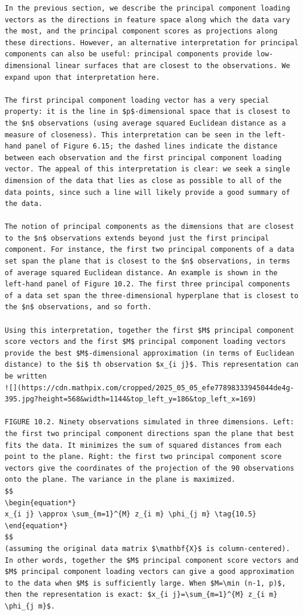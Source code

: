 \documentclass[10pt]{article}
\begin{document}
\begin{verbatim}
In the previous section, we describe the principal component loading vectors as the directions in feature space along which the data vary the most, and the principal component scores as projections along these directions. However, an alternative interpretation for principal components can also be useful: principal components provide low-dimensional linear surfaces that are closest to the observations. We expand upon that interpretation here.

The first principal component loading vector has a very special property: it is the line in $p$-dimensional space that is closest to the $n$ observations (using average squared Euclidean distance as a measure of closeness). This interpretation can be seen in the left-hand panel of Figure 6.15; the dashed lines indicate the distance between each observation and the first principal component loading vector. The appeal of this interpretation is clear: we seek a single dimension of the data that lies as close as possible to all of the data points, since such a line will likely provide a good summary of the data.

The notion of principal components as the dimensions that are closest to the $n$ observations extends beyond just the first principal component. For instance, the first two principal components of a data set span the plane that is closest to the $n$ observations, in terms of average squared Euclidean distance. An example is shown in the left-hand panel of Figure 10.2. The first three principal components of a data set span the three-dimensional hyperplane that is closest to the $n$ observations, and so forth.

Using this interpretation, together the first $M$ principal component score vectors and the first $M$ principal component loading vectors provide the best $M$-dimensional approximation (in terms of Euclidean distance) to the $i$ th observation $x_{i j}$. This representation can be written
![](https://cdn.mathpix.com/cropped/2025_05_05_efe77898333945044de4g-395.jpg?height=568&width=1144&top_left_y=186&top_left_x=169)

FIGURE 10.2. Ninety observations simulated in three dimensions. Left: the first two principal component directions span the plane that best fits the data. It minimizes the sum of squared distances from each point to the plane. Right: the first two principal component score vectors give the coordinates of the projection of the 90 observations onto the plane. The variance in the plane is maximized.
$$
\begin{equation*}
x_{i j} \approx \sum_{m=1}^{M} z_{i m} \phi_{j m} \tag{10.5}
\end{equation*}
$$
(assuming the original data matrix $\mathbf{X}$ is column-centered). In other words, together the $M$ principal component score vectors and $M$ principal component loading vectors can give a good approximation to the data when $M$ is sufficiently large. When $M=\min (n-1, p)$, then the representation is exact: $x_{i j}=\sum_{m=1}^{M} z_{i m} \phi_{j m}$.


\end{verbatim}
\end{document}

